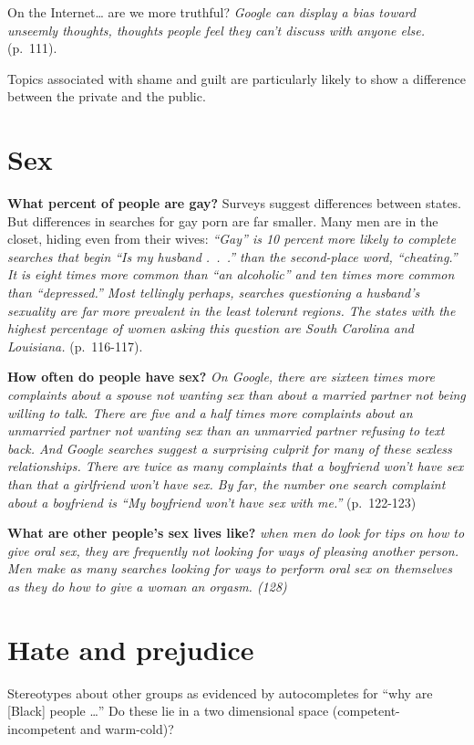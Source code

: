 \documentclass[]{book}
\theoremstyle{definition}
\theoremstyle{definition}
\theoremstyle{definition}
\theoremstyle{remark}
\begin{document}
On the Internet\ldots{} are we more truthful? \emph{Google can display a
bias toward unseemly thoughts, thoughts people feel they can't discuss
with anyone else.} (p.~111).

Topics associated with shame and guilt are particularly likely to show a
difference between the private and the public.

\section{Sex}\label{sex-1}

\textbf{What percent of people are gay?} Surveys suggest differences
between states. But differences in searches for gay porn are far
smaller. Many men are in the closet, hiding even from their wives:
\emph{``Gay'' is 10 percent more likely to complete searches that begin
``Is my husband .~.~.'' than the second-place word, ``cheating.'' It is
eight times more common than ``an alcoholic'' and ten times more common
than ``depressed.'' Most tellingly perhaps, searches questioning a
husband's sexuality are far more prevalent in the least tolerant
regions. The states with the highest percentage of women asking this
question are South Carolina and Louisiana.} (p.~116-117).

\textbf{How often do people have sex?} \emph{On Google, there are
sixteen times more complaints about a spouse not wanting sex than about
a married partner not being willing to talk. There are five and a half
times more complaints about an unmarried partner not wanting sex than an
unmarried partner refusing to text back. And Google searches suggest a
surprising culprit for many of these sexless relationships. There are
twice as many complaints that a boyfriend won't have sex than that a
girlfriend won't have sex. By far, the number one search complaint about
a boyfriend is ``My boyfriend won't have sex with me.''} (p.~122-123)

\textbf{What are other people's sex lives like?} \emph{when men do look
for tips on how to give oral sex, they are frequently not looking for
ways of pleasing another person. Men make as many searches looking for
ways to perform oral sex on themselves as they do how to give a woman an
orgasm. (128)}

\section{Hate and prejudice}\label{hate-and-prejudice}

Stereotypes about other groups as evidenced by autocompletes for ``why
are {[}Black{]} people \ldots{}'' Do these lie in a two dimensional
space (competent-incompetent and warm-cold)?
\end{document}
